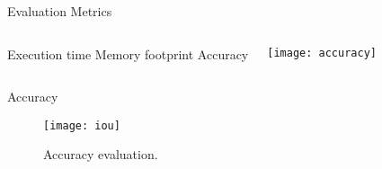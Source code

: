 \begin{frame}[t]{Evaluation Metrics} %
    \begin{columns}[c]
            \newline
            \newline
                Execution time
            \newline
            \newline
                Memory footprint
            \newline
            \newline
                Accuracy
           
            \texttt{[image: accuracy]}\hspace*{6cm}
            
    \end{columns}


\end{frame}

\begin{frame}[t]{Accuracy} %
    \begin{figure}
        \centering
        
       \texttt{[image: iou]}
       \caption{Accuracy evaluation. \cite{IoU}}
    \end{figure}
\end{frame}
